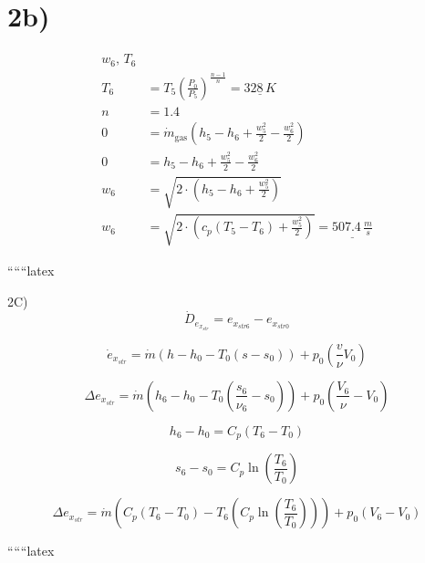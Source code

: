 

\section*{2b)}

\begin{align*}
w_6, \, T_6 \\
T_6 &= T_5 \left( \frac{P_0}{P_5} \right)^{\frac{n-1}{n}} = \underline{328 \, K} \\
n &= 1.4 \\
0 &= \dot{m}_{\text{gas}} \left( h_5 - h_6 + \frac{w_5^2}{2} - \frac{w_6^2}{2} \right) \\
0 &= h_5 - h_6 + \frac{w_5^2}{2} - \frac{w_6^2}{2} \\
w_6 &= \sqrt{2 \cdot \left( h_5 - h_6 + \frac{w_5^2}{2} \right)} \\
w_6 &= \sqrt{2 \cdot \left( c_p (T_5 - T_6) + \frac{w_5^2}{2} \right)} = \underline{507.4 \, \frac{m}{s}}
\end{align*}

``````latex

2C)
\[
\dot{D}_{e_{x_{str}}} = e_{x_{str6}} - e_{x_{str0}}
\]

\[
\dot{e}_{x_{str}} = \dot{m} (h - h_0 - T_0 (s - s_0)) + p_0 \left( \frac{v}{\nu} V_0 \right)
\]

\[
\Delta e_{x_{str}} = \dot{m} (h_6 - h_0 - T_0 (\frac{s_6}{\nu_6} - s_0)) + p_0 \left( \frac{V_6}{\nu} - V_0 \right)
\]

\[
h_6 - h_0 = C_p (T_6 - T_0)
\]

\[
s_6 - s_0 = C_p \ln \left( \frac{T_6}{T_0} \right)
\]

\[
\Delta e_{x_{str}} = \dot{m} \left( C_p (T_6 - T_0) - T_6 \left( C_p \ln \left( \frac{T_6}{T_0} \right) \right) \right) + p_0 (V_6 - V_0)
\]

``````latex